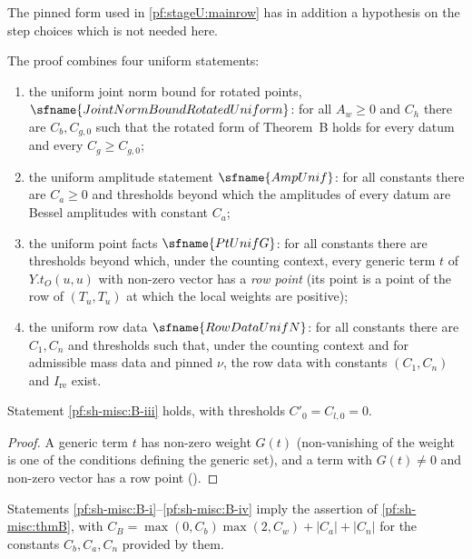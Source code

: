 The pinned form used in \cref{pf:stageU:mainrow} has in addition a hypothesis on the step choices which is not needed here.

The proof combines four uniform statements:
\begin{enumerate}[label=(\roman*)]
\item\label{pf:sh-misc:B-i} the uniform joint norm bound for rotated points, $\sfname{JointNormBoundRotatedUniform}$: for all $A_w\ge0$ and $C_h$
there are $C_b,C_{g,0}$ such that the rotated form of Theorem~B holds for every datum and every $C_g\ge C_{g,0}$;
\item\label{pf:sh-misc:B-ii} the uniform amplitude statement $\sfname{AmpUnif}$: for all constants there are $C_a\ge0$ and thresholds
beyond which the amplitudes of every datum are Bessel amplitudes with constant $C_a$;
\item\label{pf:sh-misc:B-iii} the uniform point facts $\sfname{PtUnifG}$: for all constants there are thresholds beyond which, under the
counting context, every generic term $t$ of $Y.t_O(u,u)$ with non-zero vector has a \emph{row point} (its point is a point of the row
of $(T_u,T_u)$ at which the local weights are positive);
\item\label{pf:sh-misc:B-iv} the uniform row data $\sfname{RowDataUnifN}$: for all constants there are $C_1,C_n$ and thresholds such that,
under the counting context and for admissible mass data and pinned $\nu$, the row data with constants $(C_1,C_n)$ and $I_{\mathrm{re}}$
exist.
\end{enumerate}

\begin{lemma}\label{pf:sh-misc:ptunif}
Statement \ref{pf:sh-misc:B-iii} holds, with thresholds $C'_0=C_{l,0}=0$.
\end{lemma}

\begin{proof}
A generic term $t$ has non-zero weight $G(t)$ (non-vanishing of the weight is one of the conditions defining the generic set), and a
term with $G(t)\ne0$ and non-zero vector has a row point ().
\end{proof}

\begin{lemma}\label{pf:sh-misc:combo}
Statements \ref{pf:sh-misc:B-i}--\ref{pf:sh-misc:B-iv} imply the assertion of \cref{pf:sh-misc:thmB}, with
$C_B=\max(0,C_b)\max(2,C_w)+|C_a|+|C_n|$ for the constants $C_b,C_a,C_n$ provided by them.
\end{lemma}

